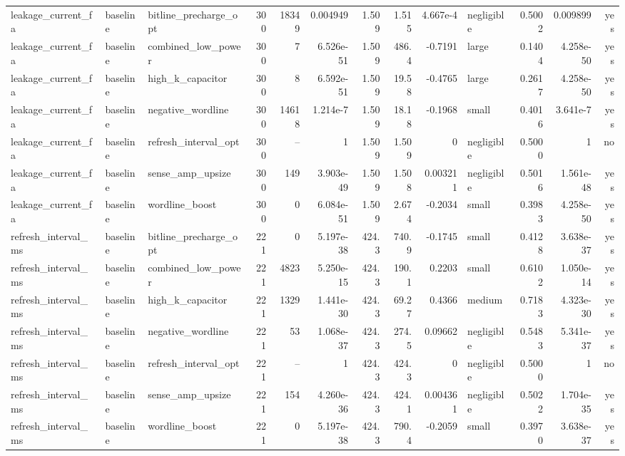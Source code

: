 \begin{table}[!t]
\begin{tabular}{lllrrrrrrlrrr}
leakage\_current\_fa & baseline & bitline\_precharge\_opt & 300 & 18349 & 0.004949 & 1.509 & 1.515 & 4.667e-4 & negligible & 0.5002 & 0.009899 & yes \\
leakage\_current\_fa & baseline & combined\_low\_power & 300 & 7 & 6.526e-51 & 1.509 & 486.4 & -0.7191 & large & 0.1404 & 4.258e-50 & yes \\
leakage\_current\_fa & baseline & high\_k\_capacitor & 300 & 8 & 6.592e-51 & 1.509 & 19.58 & -0.4765 & large & 0.2617 & 4.258e-50 & yes \\
leakage\_current\_fa & baseline & negative\_wordline & 300 & 14618 & 1.214e-7 & 1.509 & 18.18 & -0.1968 & small & 0.4016 & 3.641e-7 & yes \\
leakage\_current\_fa & baseline & refresh\_interval\_opt & 300 & -- & 1 & 1.509 & 1.509 & 0 & negligible & 0.5000 & 1 & no \\
leakage\_current\_fa & baseline & sense\_amp\_upsize & 300 & 149 & 3.903e-49 & 1.509 & 1.508 & 0.003211 & negligible & 0.5016 & 1.561e-48 & yes \\
leakage\_current\_fa & baseline & wordline\_boost & 300 & 0 & 6.084e-51 & 1.509 & 2.674 & -0.2034 & small & 0.3983 & 4.258e-50 & yes \\
refresh\_interval\_ms & baseline & bitline\_precharge\_opt & 221 & 0 & 5.197e-38 & 424.3 & 740.9 & -0.1745 & small & 0.4128 & 3.638e-37 & yes \\
refresh\_interval\_ms & baseline & combined\_low\_power & 221 & 4823 & 5.250e-15 & 424.3 & 190.1 & 0.2203 & small & 0.6102 & 1.050e-14 & yes \\
refresh\_interval\_ms & baseline & high\_k\_capacitor & 221 & 1329 & 1.441e-30 & 424.3 & 69.27 & 0.4366 & medium & 0.7183 & 4.323e-30 & yes \\
refresh\_interval\_ms & baseline & negative\_wordline & 221 & 53 & 1.068e-37 & 424.3 & 274.5 & 0.09662 & negligible & 0.5483 & 5.341e-37 & yes \\
refresh\_interval\_ms & baseline & refresh\_interval\_opt & 221 & -- & 1 & 424.3 & 424.3 & 0 & negligible & 0.5000 & 1 & no \\
refresh\_interval\_ms & baseline & sense\_amp\_upsize & 221 & 154 & 4.260e-36 & 424.3 & 424.1 & 0.004361 & negligible & 0.5022 & 1.704e-35 & yes \\
refresh\_interval\_ms & baseline & wordline\_boost & 221 & 0 & 5.197e-38 & 424.3 & 790.4 & -0.2059 & small & 0.3970 & 3.638e-37 & yes \\
\bottomrule
\end{tabular}
\end{table}
